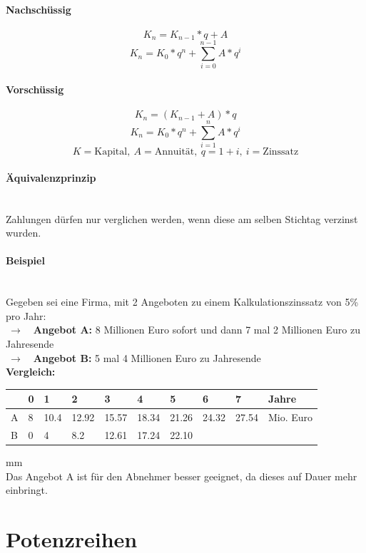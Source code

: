 \documentclass{school}
\begin{document}
\paragraph{Nachschüssig}
$$K_n = K_{n-1}*q + A$$
$$K_n = K_0 * q^n + \sum^{n-1}_{i = 0}{A * q^i}$$
\paragraph{Vorschüssig}
$$K_n = (K_{n-1} + A) * q$$
$$K_n = K_0 * q^n + \sum^{n}_{i = 1}{A * q^i}$$
\vspace{0.5 em}
$$K = \text{Kapital},~ A = \text{Annuität},~ q = 1 + i,~ i = \text{Zinssatz}$$

\paragraph{Äquivalenzprinzip}~\\
Zahlungen dürfen nur verglichen werden, wenn diese am selben Stichtag verzinst wurden.

\paragraph{Beispiel} ~\\
Gegeben sei eine Firma, mit 2 Angeboten zu einem Kalkulationszinssatz von 5\% pro Jahr:\\
$~\to \quad$\textbf{Angebot A:} 8 Millionen Euro sofort und dann 7 mal 2 Millionen Euro zu Jahresende\\
$~\to \quad$\textbf{Angebot B:} 5 mal 4 Millionen Euro zu Jahresende
\vspace{1 em}\\
\textbf{Vergleich:}
\begin{center}
    \begin{tabular}{l | l l l l l l l l l}
    & 0 & 1 & 2 & 3 & 4 & 5 & 6 & 7 & Jahre\\
    \hline
    A & 8 & 10.4 & 12.92 & 15.57 & 18.34 & 21.26 & 24.32 & 27.54 & Mio. Euro\\
    \hline
    B & 0 & 4 & 8.2 & 12.61 & 17.24 & 22.10 & & &
    \end{tabular}
\end{center}
 mm ~\\
Das Angebot A ist für den Abnehmer besser geeignet, da dieses auf Dauer mehr einbringt.

\section{Potenzreihen}
\end{document}
